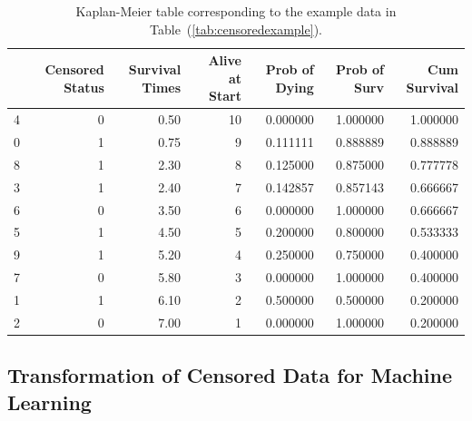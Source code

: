 \documentclass[a4paper,11pt]{article}
\begin{document}
\begin{table}[tbp]
\begin{center}
\begin{tabular}{lrrrrrr}
\toprule
{} &  Censored Status &  Survival Times &  Alive at Start &  Prob of Dying &  Prob of Surv &  Cum Survival \\
\midrule
4 &                0 &            0.50 &              10 &       0.000000 &      1.000000 &      1.000000 \\
0 &                1 &            0.75 &               9 &       0.111111 &      0.888889 &      0.888889 \\
8 &                1 &            2.30 &               8 &       0.125000 &      0.875000 &      0.777778 \\
3 &                1 &            2.40 &               7 &       0.142857 &      0.857143 &      0.666667 \\
6 &                0 &            3.50 &               6 &       0.000000 &      1.000000 &      0.666667 \\
5 &                1 &            4.50 &               5 &       0.200000 &      0.800000 &      0.533333 \\
9 &                1 &            5.20 &               4 &       0.250000 &      0.750000 &      0.400000 \\
7 &                0 &            5.80 &               3 &       0.000000 &      1.000000 &      0.400000 \\
1 &                1 &            6.10 &               2 &       0.500000 &      0.500000 &      0.200000 \\
2 &                0 &            7.00 &               1 &       0.000000 &      1.000000 &      0.200000 \\
\bottomrule
\end{tabular}
\caption{\label{tab:kaplanexample} Kaplan-Meier table corresponding to the example data in Table~(\ref{tab:censoredexample}).}
\end{center}
\end{table}
















\subsection{Transformation of Censored Data for Machine Learning}
\label{subsec:transformation}
\end{document}
